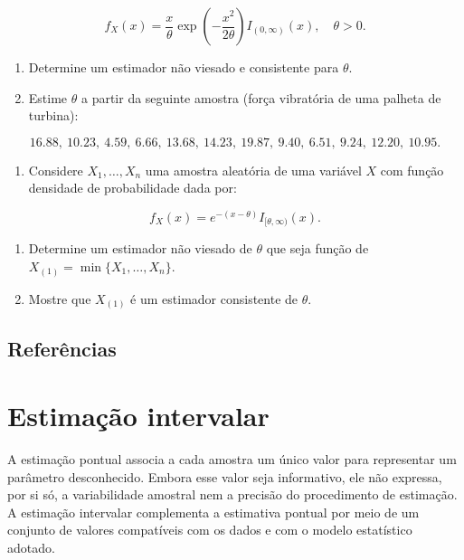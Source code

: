\documentclass[
  letterpaper,
  DIV=11,
  numbers=noendperiod]{scrreprt}
\providecommand{\tightlist}{%
  \setlength{\itemsep}{0pt}\setlength{\parskip}{0pt}}\usepackage{longtable,booktabs,array}
\begin{document}
\[f_X(x) = \frac{x}{\theta} \exp\left(-\frac{x^2}{2\theta}\right) I_{(0,\infty)}(x), \quad \theta > 0.\]

\begin{enumerate}
\def\labelenumi{\alph{enumi}.}
\item
  Determine um estimador não viesado e consistente para \(\theta\).
\item
  Estime \(\theta\) a partir da seguinte amostra (força vibratória de
  uma palheta de turbina):
\end{enumerate}

\[16.88,\ 10.23,\ 4.59,\ 6.66,\ 13.68,\ 14.23,\ 19.87,\ 9.40,\ 6.51,\ 9.24,\ 12.20,\ 10.95.\]

\begin{enumerate}
\def\labelenumi{\arabic{enumi}.}
\setcounter{enumi}{4}
\tightlist
\item
  Considere \(X_1, \ldots, X_n\) uma amostra aleatória de uma variável
  \(X\) com função densidade de probabilidade dada por:
\end{enumerate}

\[f_X(x) = e^{-(x - \theta)} I_{[\theta, \infty)}(x).\]

\begin{enumerate}
\def\labelenumi{\alph{enumi}.}
\item
  Determine um estimador não viesado de \(\theta\) que seja função de
  \(X_{(1)} = \min\{X_1, \ldots, X_n\}\).
\item
  Mostre que \(X_{(1)}\) é um estimador consistente de \(\theta\).
\end{enumerate}

\section*{Referências}\label{referuxeancias-3}



\chapter{Estimação intervalar}\label{estimauxe7uxe3o-intervalar}

A estimação pontual associa a cada amostra um único valor para
representar um parâmetro desconhecido. Embora esse valor seja
informativo, ele não expressa, por si só, a variabilidade amostral nem a
precisão do procedimento de estimação. A estimação intervalar
complementa a estimativa pontual por meio de um conjunto de valores
compatíveis com os dados e com o modelo estatístico adotado.
\end{document}
